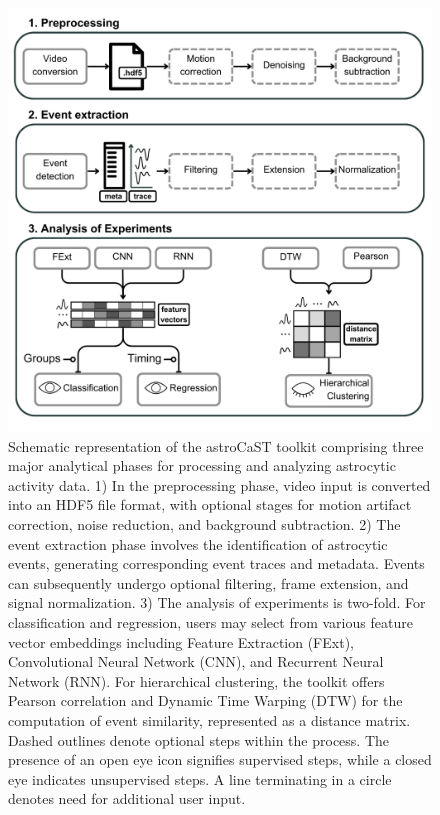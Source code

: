 \begin{figure}[!htb]
\begin{center}
\includegraphics[width=\linewidth]{figures/1.png}
\end{center}
\caption{Schematic representation of the astroCaST toolkit comprising three major analytical phases for processing and analyzing astrocytic activity data. 1) In the preprocessing phase, video input is converted into an HDF5 file format, with optional stages for motion artifact correction, noise reduction, and background subtraction. 2) The event extraction phase involves the identification of astrocytic events, generating corresponding event traces and metadata. Events can subsequently undergo optional filtering, frame extension, and signal normalization. 3) The analysis of experiments is two-fold. For classification and regression, users may select from various feature vector embeddings including Feature Extraction (FExt), Convolutional Neural Network (CNN), and Recurrent Neural Network (RNN). For hierarchical clustering, the toolkit offers Pearson correlation and Dynamic Time Warping (DTW) for the computation of event similarity, represented as a distance matrix. Dashed outlines denote optional steps within the process. The presence of an open eye icon signifies supervised steps, while a closed eye indicates unsupervised steps. A line terminating in a circle denotes need for additional user input.}\label{fig:1}
\end{figure}

